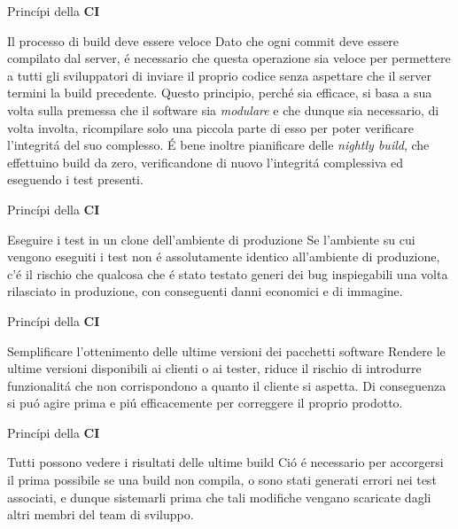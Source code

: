 \documentclass{beamer}
\begin{document}
\begin{frame}{Princ\'ipi della \textbf{CI}}
\begin{block}{Il processo di build deve essere veloce}
Dato che ogni commit deve essere compilato dal server, \'e necessario che questa operazione sia veloce per permettere a tutti
gli sviluppatori di inviare il proprio codice senza aspettare che il server termini la build precedente. Questo principio, perch\'e
sia efficace, si basa a sua volta sulla premessa che il software sia \emph{modulare} e che dunque sia necessario, di volta involta,
ricompilare solo una piccola parte di esso per poter verificare l'integrit\'a del suo complesso.
\newline
\'E bene inoltre pianificare delle \emph{nightly build}, che effettuino build da zero, verificandone di nuovo l'integrit\'a complessiva
ed eseguendo i test presenti.
\end{block}
\end{frame}

\begin{frame}{Princ\'ipi della \textbf{CI}}
\begin{block}{Eseguire i test in un clone dell'ambiente di produzione}
Se l'ambiente su cui vengono eseguiti i test non \'e assolutamente identico all'ambiente di produzione, c'\'e il rischio che qualcosa
che \'e stato testato generi dei bug inspiegabili una volta rilasciato in produzione, con conseguenti danni economici e di immagine.
\end{block}
\end{frame}

\begin{frame}{Princ\'ipi della \textbf{CI}}
\begin{block}{Semplificare l'ottenimento delle ultime versioni dei pacchetti software}
Rendere le ultime versioni disponibili ai clienti o ai tester, riduce il rischio di introdurre funzionalit\'a che non corrispondono a
quanto il cliente si aspetta. Di conseguenza si pu\'o agire prima e pi\'u efficacemente per correggere il proprio prodotto.
\end{block}
\end{frame}

\begin{frame}{Princ\'ipi della \textbf{CI}}
\begin{block}{Tutti possono vedere i risultati delle ultime build}
Ci\'o \'e necessario per accorgersi il prima possibile se una build non compila, o sono stati generati errori nei test associati, e
dunque sistemarli prima che tali modifiche vengano scaricate dagli altri membri del team di sviluppo.
\end{block}
\end{frame}
\end{document}
